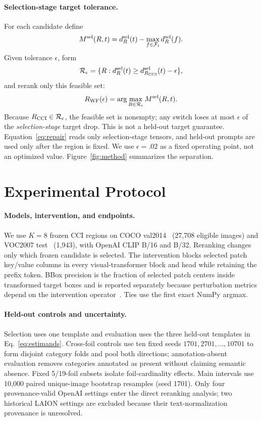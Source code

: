 \documentclass[10pt]{article}
\newcommand{\dropv}{d}
\newcommand{\foils}{\mathcal{F}}
\newcommand{\regions}{\mathcal{R}}
\begin{document}
\paragraph{Selection-stage target tolerance.}
For each candidate define
\begin{equation}
M^{\rm sel}(R,t)=\dropv_R^{\rm sel}(t)-
\max_{f\in\foils_t}\dropv_R^{\rm sel}(f).
\end{equation}
Given tolerance $\epsilon$, form
\begin{equation}
\regions_\epsilon=\{R:\dropv_R^{\rm sel}(t)\ge
\dropv_{R_{\rm CCI}}^{\rm sel}(t)-\epsilon\},
\end{equation}
and rerank only this feasible set:
\begin{equation}
R_{\rm WF}(\epsilon)=\arg\max_{R\in\regions_\epsilon}M^{\rm sel}(R,t).
\label{eq:repair}
\end{equation}
Because $R_{\rm CCI}\in\regions_\epsilon$, the feasible set is nonempty;
any switch loses at most $\epsilon$ of the \emph{selection-stage} target drop.
This is not a held-out target guarantee. Equation~\ref{eq:repair} reads only
selection-stage tensors, and held-out prompts are used only after the region is
fixed. We use $\epsilon=.02$ as a fixed operating point, not an optimized value.
Figure~\ref{fig:method} summarizes the separation.

\section{Experimental Protocol}
\paragraph{Models, intervention, and endpoints.}
We use $K=8$ frozen CCI regions on COCO val2014~\cite{lin2014coco}
(27,708 eligible images) and VOC2007 test~\cite{everingham2010voc} (1,943), with
OpenAI CLIP B/16 and B/32. Reranking changes only which frozen candidate is
selected. The intervention blocks selected patch key/value columns in every
visual-transformer block and head while retaining the prefix token. BBox precision
is the fraction of selected patch centers inside transformed target boxes and is
reported separately because perturbation metrics depend on the intervention
operator~\cite{gomez2022metrics}. Ties use the first exact NumPy argmax.

\paragraph{Held-out controls and uncertainty.}
Selection uses one template and evaluation uses the three held-out templates in
Eq.~\ref{eq:estimands}. Cross-foil controls use ten fixed seeds
$1701,2701,\ldots,10701$ to form disjoint category folds and pool both directions;
annotation-absent evaluation removes categories annotated as present without
claiming semantic absence. Fixed 5/19-foil subsets isolate foil-cardinality effects.
Main intervals use 10,000 paired unique-image bootstrap resamples (seed 1701).
Only four provenance-valid OpenAI settings enter the direct reranking analysis;
two historical LAION settings are excluded because their text-normalization
provenance is unresolved.
\end{document}
